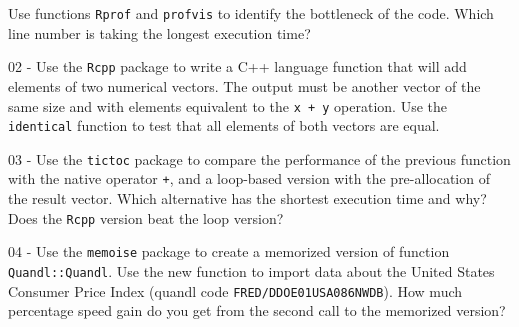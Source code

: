 \documentclass[
  12pt,
]{book}
\begin{document}
Use functions \texttt{Rprof} and \texttt{profvis} to identify the bottleneck of the code. Which line number is taking the longest execution time?

02 -
Use the \texttt{Rcpp} package to write a C++ language function that will add elements of two numerical vectors. The output must be another vector of the same size and with elements equivalent to the \texttt{x\ +\ y} operation. Use the \texttt{identical} function to test that all elements of both vectors are equal.

03 -
Use the \texttt{tictoc} package to compare the performance of the previous function with the native operator \texttt{+}, and a loop-based version with the pre-allocation of the result vector. Which alternative has the shortest execution time and why? Does the \texttt{Rcpp} version beat the loop version?

04 -
Use the \texttt{memoise} package to create a memorized version of function \texttt{Quandl::Quandl}. Use the new function to import data about the United States Consumer Price Index (quandl code \texttt{\textquotesingle{}FRED/DDOE01USA086NWDB\textquotesingle{}}). How much percentage speed gain do you get from the second call to the memorized version?

  

\printindex
\end{document}
